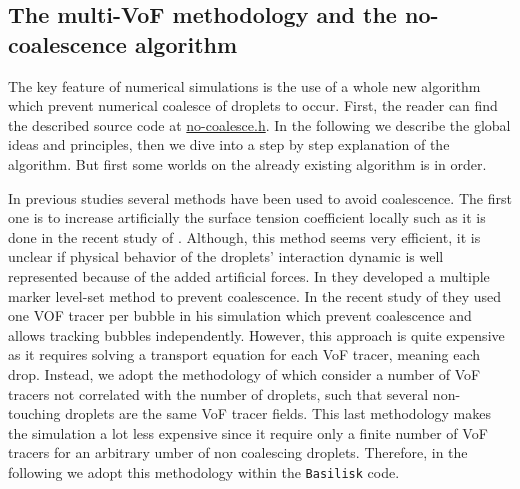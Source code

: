 \subsection{The multi-VoF methodology and the no-coalescence algorithm}


The key feature of numerical simulations is the use of a whole new algorithm which prevent numerical coalesce of droplets to occur.
First, the reader can find the described source code at \href{https://basilisk.fr/sandbox/fintzin/no-coalesce.h}{no-coalesce.h}. 
In the following we describe the global ideas and principles, then we dive into a step by step explanation of the algorithm. 
But first some worlds on the already existing algorithm is in order.

In previous studies several methods have been used to avoid coalescence. 
The first one is to increase artificially the surface tension coefficient locally such as it is done in the recent study of \citet{hidman2023assessing}.
Although, this method seems very efficient, it is unclear if physical behavior of the droplets' interaction dynamic is well represented because of the added artificial forces. 
In  \citet{balcazar2015multiple} they developed a multiple marker level-set method to prevent coalescence. 
In the recent study of \citet{zhang2021direct} they  used one VOF tracer per bubble in his simulation which prevent coalescence and allows tracking bubbles independently. 
However, this approach is quite expensive as it requires solving a transport equation for each VoF tracer, meaning each drop. 
Instead, we adopt the methodology of \citet{karnakov2022computing} which consider a number of VoF tracers not correlated with the number of droplets, such that several non-touching droplets are the same VoF tracer fields.
This last methodology makes the simulation a lot less expensive since it require only a finite number of VoF tracers for an arbitrary umber of non coalescing droplets.  
Therefore, in the following we adopt this methodology within the \texttt{Basilisk} code. 

